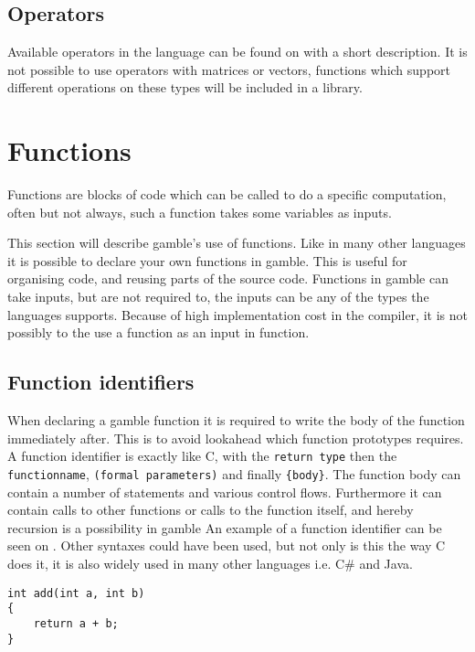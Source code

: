 \subsection*{Operators}
Available operators in the language can be found on  with a short description.  
It is not possible to use operators with matrices or vectors, functions which support different operations on these types will be included in a library.


\section{Functions}
Functions are blocks of code which can be called to do a specific computation, often but not always, such a function takes some variables as inputs.

This section will describe \gls{gamble}'s use of functions. 
Like in many other languages it is possible to declare your own functions in \gls{gamble}.
This is useful for organising code, and reusing parts of the source code.
Functions in \gls{gamble} can take inputs, but are not required to, the inputs can be any of the types the languages supports.
Because of high implementation cost in the compiler, it is not possibly to the use a function as an input in function.


\subsection*{Function identifiers}
When declaring a \gls{gamble} function it is required to write the body of the function immediately after.
This is to avoid lookahead which function prototypes requires.
A function identifier is exactly like C, with the \texttt{return type} then the \texttt{functionname}, \texttt{(formal parameters)} and finally \texttt{\{body\}}.
The function body can contain a number of statements and various control flows.
Furthermore it can contain calls to other functions or calls to the function itself, and hereby recursion is a possibility in \gls{gamble}
An example of a function identifier can be seen on .
Other syntaxes could have been used, but not only is this the way C does it, it is also widely used in many other languages i.e. C\# and Java.

\begin{lstlisting}[caption={Function Identifier},label={lst:functionID},numbers=none]                                                        
int add(int a, int b)
{
	return a + b;
}
\end{lstlisting}


